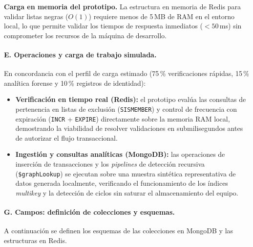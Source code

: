 \documentclass[11pt,a4paper]{article}
\begin{document}
	\textbf{Carga en memoria del prototipo.} La estructura en memoria de Redis para validar listas negras ($O(1)$) requiere menos de 5\,MB de RAM en el entorno local, lo que permite validar los tiempos de respuesta inmediatos ($<50$\,ms) sin comprometer los recursos de la máquina de desarrollo.
	
	\paragraph{E. Operaciones y carga de trabajo simulada.}
	En concordancia con el perfil de carga estimado (75\,\% verificaciones rápidas, 15\,\% analítica forense y 10\,\% registros de identidad):
	\begin{itemize}[leftmargin=2em]
		\item \textbf{Verificación en tiempo real (Redis):} el prototipo evalúa las consultas de pertenencia en listas de exclusión (\texttt{SISMEMBER}) y control de frecuencia con expiración (\texttt{INCR} + \texttt{EXPIRE}) directamente sobre la memoria RAM local, demostrando la viabilidad de resolver validaciones en submilisegundos antes de autorizar el flujo transaccional.
		\item \textbf{Ingestión y consultas analíticas (MongoDB):} las operaciones de inserción de transacciones y los \textit{pipelines} de detección recursiva (\texttt{\$graphLookup}) se ejecutan sobre una muestra sintética representativa de datos generada localmente, verificando el funcionamiento de los índices \textit{multikey} y la detección de ciclos sin saturar el almacenamiento del equipo.
	\end{itemize}
	
	\paragraph{G. Campos: definición de colecciones y esquemas.}
	A continuación se definen los esquemas de las colecciones en MongoDB y las estructuras en Redis.
	
\end{document}
